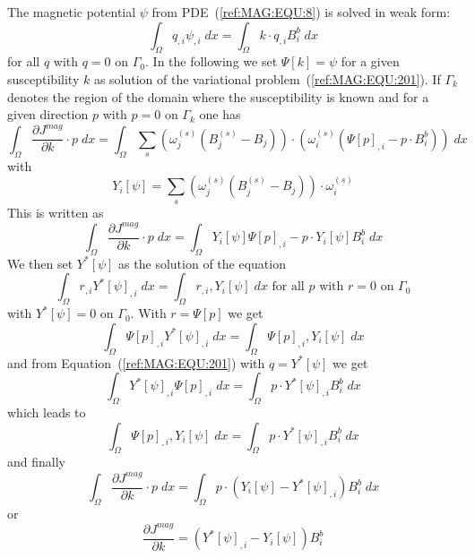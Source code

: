 The magnetic potential $\psi$ from PDE~(\ref{ref:MAG:EQU:8}) is solved in weak form:
\begin{equation}\label{ref:MAG:EQU:201}
\int_{\Omega} q_{,i} \psi_{,i} \; dx  = \int_{\Omega}  k \cdot q_{,i}  B^b_i \; dx 
\end{equation} 
for all $q$ with $q=0$ on $\Gamma_{0}$.
In the following we set $\Psi[k]=\psi$ for a given susceptibility $k$ as
solution of the variational problem~(\ref{ref:MAG:EQU:201}).
If $\Gamma_{k}$ denotes the region of the domain where the susceptibility is
known and for a given direction $p$ with $p=0$ on $\Gamma_{k}$ one has
\begin{equation}\label{ref:MAG:EQU:201aa}
\int_{\Omega}   \frac{\partial J^{mag}}{\partial k} \cdot p \; dx  = \int_{\Omega}  
\sum_{s} (\omega^{(s)}_j 
( B^{(s)}_j-B_{j}))  \cdot ( \omega^{(s)}_i ( \Psi[p]_{,i} - p  \cdot B^b_i  ) ) \; dx  
\end{equation} 
with
\begin{equation}\label{ref:MAG:EQU:202c}
Y_i[\psi]=   \sum_{s} (\omega^{(s)}_j 
(B^{(s)}_j - B_{j}) )  \cdot \omega^{(s)}_i  
\end{equation} 
This is written as 
\begin{equation}\label{ref:MAG:EQU:202cc}
\int_{\Omega}   \frac{\partial J^{mag}}{\partial k} \cdot p \;  dx  = \int_{\Omega}  
Y_i[\psi] \Psi[p]_{,i} - p \cdot Y_i[\psi]B^b_i   \; dx  
\end{equation} 
We then set $Y^*[\psi]$ as the solution of the equation 
\begin{equation}\label{ref:MAG:EQU:202d}
\int_{\Omega} r_{,i} Y^*[\psi]_{,i} \; dx  =  \int_{\Omega} r_{,i} ,Y_i[\psi]  \; dx  \mbox{ for all } p \mbox{ with } r=0 \mbox{ on } \Gamma_{0}
\end{equation} 
with $Y^*[\psi]=0$ on $\Gamma_{0}$. With $r=\Psi[p]$ we get
\begin{equation}\label{ref:MAG:EQU:202dd}
\int_{\Omega} \Psi[p]_{,i} Y^*[\psi]_{,i} \; dx  =  \int_{\Omega} \Psi[p]_{,i} ,Y_i[\psi]  \; dx
\end{equation} 
and from Equation~(\ref{ref:MAG:EQU:201}) with $q=Y^*[\psi]$ we get
\begin{equation}\label{ref:MAG:EQU:20e}
\int_{\Omega} Y^*[\psi]_{,i}  \Psi[p]_{,i} \; dx  = \int_{\Omega}  p \cdot Y^*[\psi]_{,i}  B^b_i \; dx  
\end{equation}
which leads to 
\begin{equation}\label{ref:MAG:EQU:20ee}
\int_{\Omega} \Psi[p]_{,i} ,Y_i[\psi]  \; dx  = \int_{\Omega}  p \cdot Y^*[\psi]_{,i}  B^b_i \; dx  
\end{equation}
and finally
\begin{equation}\label{ref:MAG:EQU:201a}
\int_{\Omega}   \frac{\partial J^{mag}}{\partial k} \cdot p \;  dx  = \int_{\Omega}  
p \cdot (Y_i[\psi] - Y^*[\psi]_{,i})  B^b_i \; dx  
\end{equation} 
or 
\begin{equation}\label{ref:MAG:EQU:201b}
\frac{\partial J^{mag}}{\partial k} = (Y^*[\psi]_{,i}-Y_i[\psi])  B^b_i
\end{equation}

